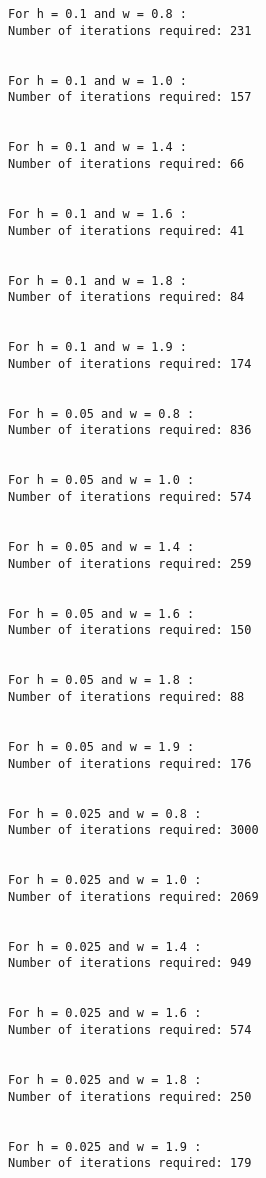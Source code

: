 \documentclass[11pt]{article}
\begin{document}
    \begin{Verbatim}[commandchars=\\\{\}]
For h = 0.1 and w = 0.8 :
Number of iterations required: 231


For h = 0.1 and w = 1.0 :
Number of iterations required: 157


For h = 0.1 and w = 1.4 :
Number of iterations required: 66


For h = 0.1 and w = 1.6 :
Number of iterations required: 41


For h = 0.1 and w = 1.8 :
Number of iterations required: 84


For h = 0.1 and w = 1.9 :
Number of iterations required: 174


For h = 0.05 and w = 0.8 :
Number of iterations required: 836


For h = 0.05 and w = 1.0 :
Number of iterations required: 574


For h = 0.05 and w = 1.4 :
Number of iterations required: 259


For h = 0.05 and w = 1.6 :
Number of iterations required: 150


For h = 0.05 and w = 1.8 :
Number of iterations required: 88


For h = 0.05 and w = 1.9 :
Number of iterations required: 176


For h = 0.025 and w = 0.8 :
Number of iterations required: 3000


For h = 0.025 and w = 1.0 :
Number of iterations required: 2069


For h = 0.025 and w = 1.4 :
Number of iterations required: 949


For h = 0.025 and w = 1.6 :
Number of iterations required: 574


For h = 0.025 and w = 1.8 :
Number of iterations required: 250


For h = 0.025 and w = 1.9 :
Number of iterations required: 179


    \end{Verbatim}
\end{document}
